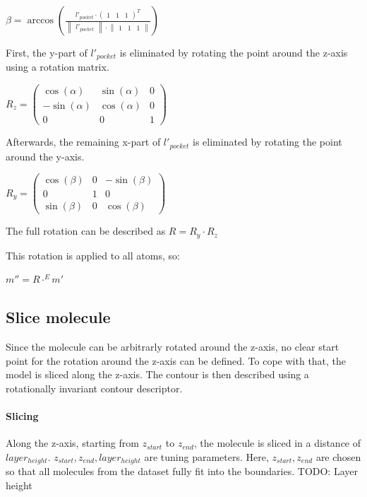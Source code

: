 $\beta = \arccos \left(
  \frac{
    l'_{pocket}
  \cdot 
  \begin{pmatrix}
    1 &
    1 &
    1
  \end{pmatrix}^T}
  {
  \begin{Vmatrix}
    l'_{pocket}
  \end{Vmatrix}
  \cdot 
  \begin{Vmatrix}
    1 &
    1 &
    1
  \end{Vmatrix}}
\right)
$

First, the y-part of $l'_{pocket}$ is eliminated by rotating the point around the z-axis using a rotation matrix.

$
R_z =
\begin{pmatrix}
  \cos(\alpha) & \sin(\alpha) & 0 \\
  -\sin(\alpha) & \cos(\alpha) & 0 \\
  0 & 0 & 1
\end{pmatrix}
$

Afterwards, the remaining x-part of $l'_{pocket}$ is eliminated by rotating the point around the y-axis.

$
R_y =
\begin{pmatrix}
  \cos(\beta) & 0 & -\sin(\beta) \\
  0 & 1 & 0 \\
  \sin(\beta) & 0 & \cos(\beta) 
\end{pmatrix}
$

The full rotation can be described as $R = R_y \cdot R_z$

This rotation is applied to all atoms, so:

$m'' = R \cdot^E m'$


\subsection{Slice molecule}

Since the molecule can be arbitrarly rotated around the z-axis, no clear start point for the rotation around the z-axis can be defined.
To cope with that, the model is sliced along the z-axis. 
The contour is then described using a rotationally invariant contour descriptor.

\paragraph{Slicing}

Along the z-axis, starting from $z_{start}$ to $z_{end}$, the molecule is sliced in a distance of $layer_{height}$.
$z_{start}, z_{end}, layer_{height}$ are tuning parameters. 
Here, $z_{start}, z_{end}$ are chosen so that all molecules from the dataset fully fit into the boundaries.
TODO: Layer height %


